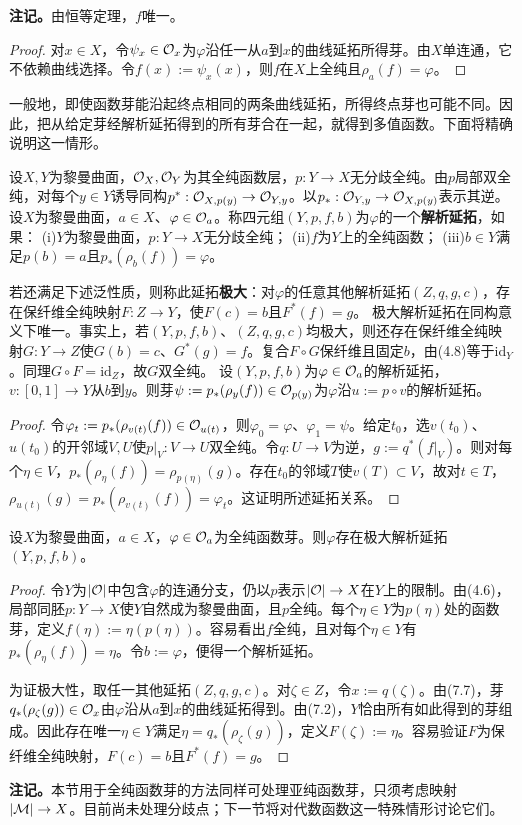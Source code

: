 \textbf{注记。}由恒等定理，$f$唯一。
\begin{proof}
对$x\in X$，令$\psi_x\in\mathcal O_x$为$\varphi$沿任一从$a$到$x$的曲线延拓所得芽。由$X$单连通，它不依赖曲线选择。令$f(x):=\psi_x(x)$，则$f$在$X$上全纯且$\rho_a(f)=\varphi$。
\end{proof}
一般地，即使函数芽能沿起终点相同的两条曲线延拓，所得终点芽也可能不同。因此，把从给定芽经解析延拓得到的所有芽合在一起，就得到多值函数。下面将精确说明这一情形。

设$X,Y$为黎曼曲面，$\mathcal O_X,\mathcal O_Y$为其全纯函数层，$p:Y\to X$无分歧全纯。由$p$局部双全纯，对每个$y\in Y$诱导同构$p^*:\mathcal O_{X,p(y)}\to\mathcal O_{Y,y}$。以$p_*:\mathcal O_{Y,y}\to\mathcal O_{X,p(y)}$表示其逆。
设$X$为黎曼曲面，$a\in X$、$\varphi\in\mathcal O_a$。称四元组$(Y,p,f,b)$为$\varphi$的一个\textbf{解析延拓}，如果：
(i)$Y$为黎曼曲面，$p:Y\to X$无分歧全纯；
(ii)$f$为$Y$上的全纯函数；
(iii)$b\in Y$满足$p(b)=a$且$p_*(\rho_b(f))=\varphi$。

若还满足下述泛性质，则称此延拓\textbf{极大}：对$\varphi$的任意其他解析延拓$(Z,q,g,c)$，存在保纤维全纯映射$F:Z\to Y$，使$F(c)=b$且$F^*(f)=g$。
极大解析延拓在同构意义下唯一。事实上，若$(Y,p,f,b)$、$(Z,q,g,c)$均极大，则还存在保纤维全纯映射$G:Y\to Z$使$G(b)=c$、$G^*(g)=f$。复合$F\circ G$保纤维且固定$b$，由(4.8)等于$\mathrm{id}_Y$。同理$G\circ F=\mathrm{id}_Z$，故$G$双全纯。
设$(Y,p,f,b)$为$\varphi\in\mathcal O_a$的解析延拓，$v:[0,1]\to Y$从$b$到$y$。则芽$\psi:=p_*(\rho_y(f))\in\mathcal O_{p(y)}$为$\varphi$沿$u:=p\circ v$的解析延拓。
\begin{proof}
令$\varphi_t:=p_*(\rho_{v(t)}(f))\in\mathcal O_{u(t)}$，则$\varphi_0=\varphi$、$\varphi_1=\psi$。给定$t_0$，选$v(t_0)$、$u(t_0)$的开邻域$V,U$使$p|_V:V\to U$双全纯。令$q:U\to V$为逆，$g:=q^*(f|_V)$。则对每个$\eta\in V$，$p_*(\rho_\eta(f))=\rho_{p(\eta)}(g)$。存在$t_0$的邻域$T$使$v(T)\subset V$，故对$t\in T$，$\rho_{u(t)}(g)=p_*(\rho_{v(t)}(f))=\varphi_t$。这证明所述延拓关系。
\end{proof}
设$X$为黎曼曲面，$a\in X$，$\varphi\in\mathcal O_a$为全纯函数芽。则$\varphi$存在极大解析延拓$(Y,p,f,b)$。
\begin{proof}
令$Y$为$|\mathcal O|$中包含$\varphi$的连通分支，仍以$p$表示$|\mathcal O|\to X$在$Y$上的限制。由(4.6)，局部同胚$p:Y\to X$使$Y$自然成为黎曼曲面，且$p$全纯。每个$\eta\in Y$为$p(\eta)$处的函数芽，定义$f(\eta):=\eta(p(\eta))$。容易看出$f$全纯，且对每个$\eta\in Y$有$p_*(\rho_\eta(f))=\eta$。令$b:=\varphi$，便得一个解析延拓。

为证极大性，取任一其他延拓$(Z,q,g,c)$。对$\zeta\in Z$，令$x:=q(\zeta)$。由(7.7)，芽$q_*(\rho_\zeta(g))\in\mathcal O_x$由$\varphi$沿从$a$到$x$的曲线延拓得到。由(7.2)，$Y$恰由所有如此得到的芽组成。因此存在唯一$\eta\in Y$满足$\eta=q_*(\rho_\zeta(g))$，定义$F(\zeta):=\eta$。容易验证$F$为保纤维全纯映射，$F(c)=b$且$F^*(f)=g$。
\end{proof}
\textbf{注记。}本节用于全纯函数芽的方法同样可处理亚纯函数芽，只须考虑映射$|\mathcal M|\to X$。目前尚未处理分歧点；下一节将对代数函数这一特殊情形讨论它们。
